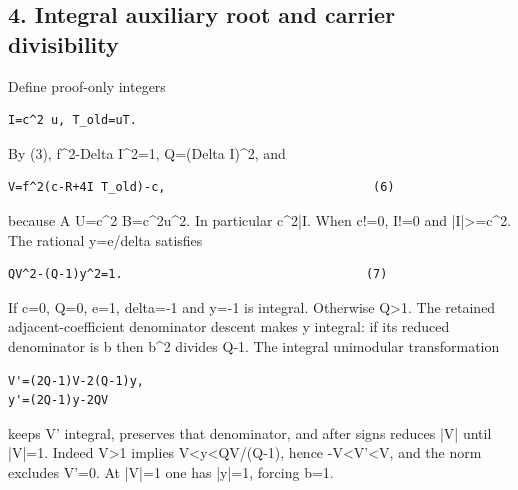 \subsection{4. Integral auxiliary root and carrier divisibility}



Define proof-only integers



\begin{verbatim}
I=c^2 u, T_old=uT.
\end{verbatim}

By (3), f\textasciicircum{}\allowbreak{}2-Delta I\textasciicircum{}\allowbreak{}2=\allowbreak{}1, Q=\allowbreak{}(Delta I)\textasciicircum{}\allowbreak{}2, and



\begin{verbatim}
V=f^2(c-R+4I T_old)-c,                             (6)
\end{verbatim}

because A U=\allowbreak{}c\textasciicircum{}\allowbreak{}2 B=\allowbreak{}c\textasciicircum{}\allowbreak{}2u\textasciicircum{}\allowbreak{}2. In particular c\textasciicircum{}\allowbreak{}2|I. When c!=\allowbreak{}0, I!=\allowbreak{}0 and |I|\textgreater{}\allowbreak{}=\allowbreak{}c\textasciicircum{}\allowbreak{}2. The rational y=\allowbreak{}e/\allowbreak{}delta satisfies



\begin{verbatim}
QV^2-(Q-1)y^2=1.                                  (7)
\end{verbatim}

If c=\allowbreak{}0, Q=\allowbreak{}0, e=\allowbreak{}1, delta=\allowbreak{}-1 and y=\allowbreak{}-1 is integral. Otherwise Q\textgreater{}\allowbreak{}1. The retained adjacent-coefficient denominator descent makes y integral: if its reduced denominator is b then b\textasciicircum{}\allowbreak{}2 divides Q-1. The integral unimodular transformation



\begin{verbatim}
V'=(2Q-1)V-2(Q-1)y,
y'=(2Q-1)y-2QV
\end{verbatim}

keeps V' integral, preserves that denominator, and after signs reduces |V| until |V|=\allowbreak{}1. Indeed V\textgreater{}\allowbreak{}1 implies V\textless{}\allowbreak{}y\textless{}\allowbreak{}QV/\allowbreak{}(Q-1), hence -V\textless{}\allowbreak{}V'\textless{}\allowbreak{}V, and the norm excludes V'=\allowbreak{}0. At |V|=\allowbreak{}1 one has |y|=\allowbreak{}1, forcing b=\allowbreak{}1.



